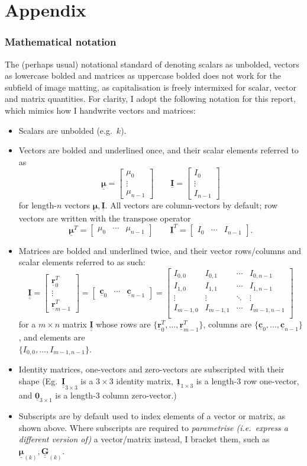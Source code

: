 \documentclass{article}
\newcommand{\bmat}[1]{\begin{bmatrix}#1\end{bmatrix}}
\theoremstyle{definition}
\def\vt#1{\underline{\mathbf{#1}}}
\def\vts#1{\underline{\boldsymbol{#1}}}
\def\mt#1{\underline{\underline{\mathbf{#1}}}}
\begin{document}
\vfill
\appendix
\part{Appendix}
\parttoc

\newpage
\section{Mathematical notation}\label{appendix:notation}
The (perhaps usual) notational standard of denoting scalars as unbolded, vectors as lowercase bolded and matrices as uppercase bolded does not work for the subfield of image matting, as capitalisation is freely intermixed for scalar, vector and matrix quantities. For clarity, I adopt the following notation for this report, which mimics how I handwrite vectors and matrices:
\begin{itemize}
    \item Scalars are unbolded (e.g.\ $k$).
    \item Vectors are bolded and underlined once, and their scalar elements referred to as
    $$\vts \mu = \bmat{\mu_0 \\ \vdots \\ \mu_{n-1}}  \qquad \vt I =\bmat{I_0 \\ \vdots \\ I_{n-1}}$$
    for length-$n$ vectors $\vts\mu, \vt I$. All vectors are column-vectors by default; row vectors are written with the transpose operator
    $$\vts\mu^T = \bmat{\mu_0 & \cdots & \mu_{n-1}} \qquad \vt I^T = \bmat{I_0 & \cdots & I_{n-1}}.$$
    \item Matrices are bolded and underlined twice, and their vector rows/columns and scalar elements referred to as such:
    $$\mt I = \bmat{\vt r_0^T \\ \vdots \\ \vt r_{m-1}^T } = \bmat{\vt c_0 & \cdots & \vt c_{n-1}} = \bmat{
        I_{0,0} & I_{0,1} & \cdots & I_{0,n-1} \\
        I_{1,0} & I_{1,1} & \cdots & I_{1,n-1} \\
        \vdots & \vdots  & \ddots & \vdots \\
        I_{m-1,0} & I_{m-1,1} & \cdots & I_{m-1,n-1} \\
    }$$
    for a $m\times n$ matrix $\mt I$ whose rows are $\{\vt r_0^T, \dots, \vt r_{m-1}^T\}$, columns are $\{\vt c_0, \dots, \vt c_{n-1}\}$, and elements are\\$\{I_{0,0}, \dots, I_{m-1,n-1}\}$.
    \item Identity matrices, one-vectors and zero-vectors are subscripted with their shape (Eg.\ $\mt I_{3\times 3}$ is a $3\times 3$ identity matrix, $\vt{1}_{1\times 3}$ is a length-$3$ row one-vector, and $\vt{0}_{3\times 1}$ is a length-$3$ column zero-vector.)
    \item Subscripts are by default used to index elements of a vector or matrix, as shown above. Where subscripts are required to \emph{parametrise (i.e.\ express a different version of)} a vector/matrix instead, I bracket them, such as $\vts \mu_{(k)}, \mt G_{(k)}$.
\end{itemize}
\end{document}
